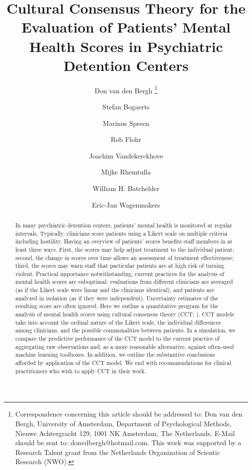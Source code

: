 \documentclass[a4paper]{article}
\title{Cultural Consensus Theory for the Evaluation of Patients' Mental Health Scores in Psychiatric Detention Centers}
\author[1]{Don van den Bergh%
\thanks{Correspondence concerning this article should be addressed to: Don van den Bergh, University of Amsterdam, Department of Psychological Methods, Nieuwe Achtergracht 129, 1001 NK Amsterdam, The Netherlands. E-Mail should be sent to: donvdbergh@hotmail.com. This work was supported by a Research Talent grant from the Netherlands Organization of Scientic Research (NWO).
}}
\author[2]{Stefan Bogaerts}
\author[3]{Marinus Spreen}
\author[4]{Rob Flohr}
\author[5]{Joachim Vandekerckhove}
\author[6]{Mijke Rhemtulla}
\author[5]{William H. Batchelder}
\author[1]{Eric-Jan Wagenmakers}
\affil[1]{University of Amsterdam}
\affil[2]{University of Tilburg}
\affil[3]{Mesdag Clinic}
\affil[4]{Stenden University of Applied Sciences}
\affil[5]{University of California Irvine}
\affil[6]{University of California Davis}
\date{}
\begin{document}

%
%
%



\maketitle

\begin{abstract}
In many psychiatric detention centers, patients' mental health is monitored at regular intervals. Typically, clinicians score patients using a Likert scale on multiple criteria including hostility. Having an overview of patients’ scores benefits staff members in at least three ways. First, the scores may help adjust treatment to the individual patient; second, the change in scores over time allows an assessment of treatment effectiveness; third, the scores may warn staff that particular patients are at high risk of turning violent. Practical importance notwithstanding, current practices for the analysis of mental health scores are suboptimal: evaluations from different clinicians are averaged (as if the Likert scale were linear and the clinicians identical), and patients are analyzed in isolation (as if they were independent). Uncertainty estimates of the resulting score are often ignored. Here we outline a quantitative program for the analysis of mental health scores using cultural consensus theory (CCT; ). CCT models take into account the ordinal nature of the Likert scale, the individual differences among clinicians, and the possible commonalities between patients. In a simulation, we compare the predictive performance of the CCT model to the current practice of aggregating raw observations and, as a more reasonable alternative, against often-used machine learning toolboxes. In addition, we outline the substantive conclusions afforded by application of the CCT model. We end with recommendations for clinical practitioners who wish to apply CCT in their work. 
\end{abstract}
\newpage
\end{document}
